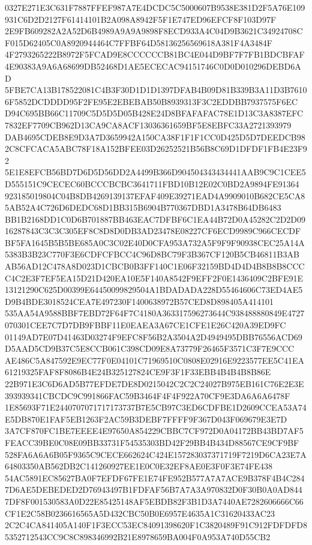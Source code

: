 \documentclass[UTF8,fontset=fandol,zihao=-4,a4paper]{ctexart}
\begin{document}
{{0327E271E3C631F7887FFEF987A7E4DCDC5C5000607B9538E381D2F5A76E109931C6D2D2127F61414101B2A098A8942F5F1E747ED96EFCF8F103D97F
2E9FB609282A2A52D6B4989A9A9A9898F8ECD933A4C04D9B3621C34924708CF015D62405C0A8920944464C7FFBF64D58136256569618A381F4A3484F
4F2793265222B8972F5FCAD9E8CCCCCCB81BC4E044D9BF7F7FB1BDCBFAF4E90383A9A6A68699DB52468D1AE5ECECAC94151746C0D0D010296DEBD6AD
5FBE7CA13B178522081C4B3F30D1D1D1397DFAB4B09D81B339B3A11D3B76106F5852DCDDDD95F2FE95E2EBEBAB50B8939313F3C2EDDBB7937575F6EC
D94C695BB66C11709C5D5D5D05B428E24D8BFAFAFAC78E1D13C3A8387EFC7832EF7709CB962D13CA9CA8ACF13036361659BF5E8EBFC33A2721393979
DAB4695CDEB8E9D3A7D3659942A150CA38F1F1F1CC0D425D5D7DEEDCB982C8CFCACA5ABC78F18A152BFEE03D26252521B56B8C69D1DFDF1FB4E23F92
5E1E8EFCB56BD7D6D5D56DD2A4499B366D904504343434441AAB9C9C1CEE5D555151C9CECEC60BCCCBCBC3641711FBD10B12E02C0BD2A9894FE91364
923185019804C04B8DB4269139137EFAF409E39271EAD4A9909010B682CE5CA85AB52A4C726D6DEDC68D1BB315B6904B770367DBD1A3478B64DB6483
BB1B2168DD1C0D6B701887BB463EAC7DFBF6C1EA44B72D0A45282C2D2D0916287843C3C3C305EF8C8D8D0DB3AD23478E08227CF6ECD9989C966CECDF
BF5FA1645B5B5BE685A0C3C02E40D0CFA953A732A5F9F9F90938CEC25A14A5383B3B23C770F3E6CDFCFBCC4C96D8BC79F3B367CF120B5CB46811B3AB
AB56AD12C478A8D023D1CBCB0B3FF140C1E06F32159BD4D4D4B8B8B8CCCC4C2E3F7EF5EA15D21D420EA10E5F140A8542F9EFF2F0E1436409C2BFE91E
13121290C625D00399E64450099829504A1BDADADA228D55464606C73ED4AE5D9B4BDE3018524CEA7E497230F1400638972B57CED8D898405A414101
535AA54A9588BBF7EBD72F64F7C4180A363317596273644C938488880849E4727070301CEE7C7D7DB9FBBF11E0EAEA3A67CE1CFE1E26C420A39ED9FC
01149AD7E07D41463D03274F9EFC8F56B2A3504A2D4949495DBB76556ACD69D5AAD5CD9B37C5E8CCB061C398CD09E8A73779F26465F3571C3F7E9CCC
AE486C5A847592E9EC77F0E04101C71969510C0808E02916E9223577EE5C41EA61219325FAF8F8086B4E24B325127824CE9F3F1F33EBB4B4B4B8B86E
22B971E3C6D6AD5B77EFDE7DE8D0215042C2C2C24027B975EB161C76E2E3E393939341CBCDC9C991866FAC59B3464F4F4F922A70CF9E3DA6A6A6478F
1E85693F71E2440707071717173737B7E5CB97C3ED6CDFBE1D2609CCEA53A74E5DB870E1FAF5EB1263F2AC59B3DEBF7FFFF9F367D043F069679E3E7D
3A7CF870FC1BE7EEEE4E97650A854229CBBC7CF972D0A04172BB43BD7AF5FEACC39BE0C08E09BB33731F54535303BD42F29BB4B434D88567CE9CF9BF
528FA6A6A6B05F9365C9CECE662624C424E157283037371719F7219D6CA23E7A64803350AB562DB2C141260927EE1E0C0E32EF8AE0E3F0F3E74FE438
54AC5891EC85627BA0F7EFDF67FE1E74FE952B577A7A7ACE9B378F4B4C2847D6AE5DEBEDED2D76943497B1FDFAF56B7A7A3A970832D0F30B0A0AD844
7DF8F001530583A0D22E85425148AF5EBDB82F3B1D3A7440AE7282606666C66CF1E2C58B0236616565A5D432CBC50B0E6957E4635A1C31620433AC23
2C2C4CA841405A140F1F3ECC53EC84091398620F1C3820489F91C912FDFDFD85352712543CC9C8C898346992B21E8978659BA004F0A953A740D55CB2
}}
\end{document}
